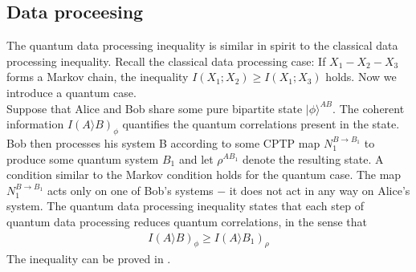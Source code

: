 \subsection{Data proceesing}
The quantum data processing inequality is similar in spirit to the classical data processing inequality. Recall the classical data processing case: If $X_1-X_2-X_3$ forms a Markov chain, the inequality $I(X_1;X_2) \geq I(X_1;X_3)$ holds. Now we introduce a quantum case. \\
Suppose that Alice and Bob share some pure bipartite state $|\phi \rangle ^{AB}$. The coherent information $I(A\rangle B)_{\phi}$ quantifies the quantum correlations present in the state. Bob then processes his system B according to some CPTP map $N_1^{B\to B_1}$ to produce some quantum system $B_1$ and let $\rho ^{AB_1}$ denote the resulting state. A condition similar to the Markov condition holds for the quantum case. The map $N_1^{B\to B_1}$ acts only on one of Bob's systems $-$ it does not act in any way on Alice's system. The quantum data processing inequality states that each step of quantum data processing reduces quantum correlations, in the sense that
\begin{align*}
I(A \rangle B)_{\phi} \geq I(A \rangle B_1)_{\rho}
\end{align*}
The inequality can be proved in \cite{CtoQ}.
